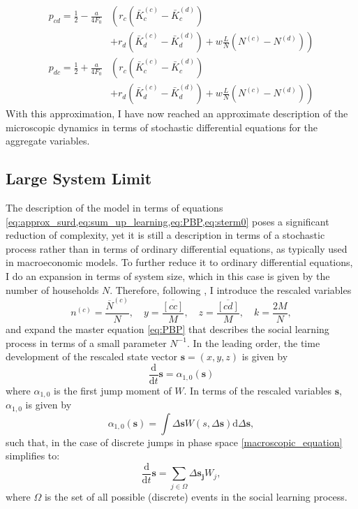 \begin{align}
	p_{cd} = \frac{1}{2} - \frac{a}{4 F_0} &\left(r_c\left( \bar{K}_c^{(c)} - \bar{K}_c^{(d)} \right) \right. \nonumber \\ 
	& \left. + r_d\left( \bar{K}_d^{(c)} - \bar{K}_d^{(d)} \right) + w\frac{L}{N}\left( N^{(c)} - N^{(d)} \right) \right) \label{eq:approx_p_cd_final}\\
	p_{dc} = \frac{1}{2} + \frac{a}{4 F_0} &\left(r_c\left( \bar{K}_c^{(c)} - \bar{K}_c^{(d)} \right) \right. \nonumber \\ 
	& \left. + r_d\left( \bar{K}_d^{(c)} - \bar{K}_d^{(d)} \right) + w\frac{L}{N}\left( N^{(c)} - N^{(d)} \right) \right)  \label{eq:approx_p_dc_final}
\end{align}
With this approximation, I have now reached an approximate description of the microscopic dynamics in terms of stochastic differential equations for the aggregate variables.
\subsection{Large System Limit}
\label{sec:large_system_limit}
The description of the model in terms of equations \cref{eq:approx_surd,eq:sum_up_learning,eq:PBP,eq:sterm0} poses a significant reduction of complexity, yet it is still a description in terms of a stochastic process rather than in terms of ordinary differential equations, as typically used in macroeconomic models. To further reduce it to ordinary differential equations, I do an expansion in terms of system size, which in this case is given by the number of households $N$.
Therefore, following \citet[p. 244]{VanKampen1992}, I introduce the rescaled variables
\begin{equation}
  n^{(c)} = \frac{\overbar{N}^{(c)}}{N}, \quad y = \frac{\overbar{[cc]}}{M}, \quad z = \frac{\overbar{[cd]}}{M}, \quad k = \frac{2M}{N},
	\label{eq:rescalled_pbp_variables}
\end{equation}
and expand the master equation \cref{eq:PBP} that describes the social learning process in terms of a small parameter $N^{-1}$. In the leading order, the time development of the rescaled state vector $\mathbf{s} = (x, y, z)$ is given by 
\begin{equation}
	\frac{\mathrm{d}}{\mathrm{d}t}\mathbf{s} = \alpha_{1,0}(\mathbf{s})
	\label{macroscopic_equation}
\end{equation}
where $\alpha_{1,0}$ is the first jump moment of $W$. In terms of the rescaled variables $\mathbf{s}$, $\alpha_{1,0}$ is given by
\begin{equation}
	\alpha_{1,0}(\mathbf{s}) = \int \Delta \mathbf{s} W(s, \Delta \mathbf{s}) \mathrm{ d} \Delta \mathbf{s},
	\label{eq:jump_moment}
\end{equation}
such that, in the case of discrete jumps in phase space \cref{macroscopic_equation} simplifies to:
\begin{equation}
	\frac{\mathrm{d}}{\mathrm{d}t}\mathbf{s} = \sum_{j \in \Omega}  \Delta \mathbf{s_j} W_j,
	\label{eq:lsl_transitions}
\end{equation}
where $\Omega$ is the set of all possible (discrete) events in the social learning process.

